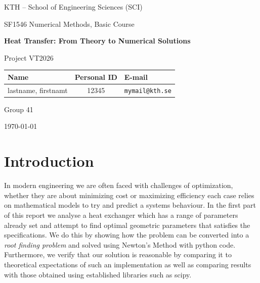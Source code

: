 \documentclass[11pt, a4paper]{article}
\theoremstyle{definition}
\begin{document}
\begin{titlepage}
  \centering
  \vspace*{1.5cm}
  {\Large KTH -- School of Engineering Sciences (SCI)\par}
  \vspace{0.4cm}
  {\large SF1546 Numerical Methods, Basic Course\par}
  \vspace{2cm}
  {\huge\bfseries Heat Transfer: From Theory to Numerical Solutions\par}
  \vspace{0.8cm}
  {\Large Project VT2026\par}
  \vspace{3cm}

  \begin{tabular}{@{}lcl@{}}
    \toprule
    \textbf{Name} & \textbf{Personal ID} & \textbf{E-mail} \\
    \midrule
    lastname, firstnamt & 12345 & \texttt{mymail@kth.se} \\
    \bottomrule
  \end{tabular}

  \vspace{1.5cm}
  {\large Group 41\par}
  \vspace{0.5cm}
  {\large \today\par}
\end{titlepage}

\tableofcontents
\newpage

\section{Introduction}
In modern engineering we are often faced with challenges of optimization, whether they are about minimizing cost or maximizing efficiency each case relies on mathematical models to try and predict a systems behaviour. In the first part of this report we analyse a heat exchanger which has a range of parameters already set and attempt to find optimal geometric parameters that satisfies the specifications. We do this by showing how the problem can be converted into a \textit{root finding problem} and solved using Newton's Method with python code. Furthermore, we verify that our solution is reasonable by comparing it to theoretical expectations of such an implementation as well as comparing results with those obtained using established libraries such as scipy.
\end{document}
